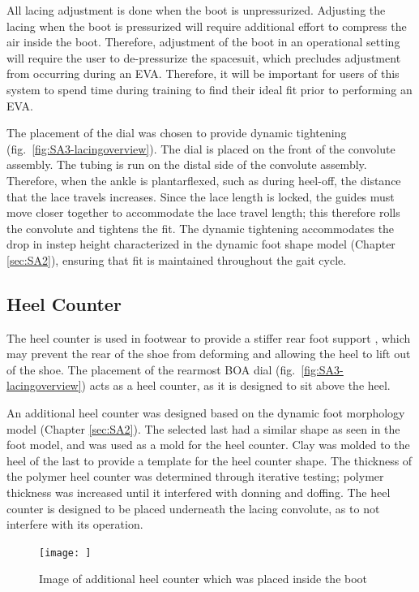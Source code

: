 \documentclass[defaultstyle,11pt]{thesis}
\begin{document}
All lacing adjustment is done when the boot is unpressurized.
Adjusting the lacing when the boot is pressurized will require additional effort to compress the air inside the boot.
Therefore, adjustment of the boot in an operational setting will require the user to de-pressurize the spacesuit, which precludes adjustment from occurring during an EVA.
Therefore, it will be important for users of this system to spend time during training to find their ideal fit prior to performing an EVA.

The placement of the dial was chosen to provide dynamic tightening (fig.~\ref{fig:SA3-lacingoverview}).
The dial is placed on the front of the convolute assembly.
The tubing is run on the distal side of the convolute assembly.
Therefore, when the ankle is plantarflexed, such as during heel-off, the distance that the lace travels increases.
Since the lace length is locked, the guides must move closer together to accommodate the lace travel length; this therefore rolls the convolute and tightens the fit.
The dynamic tightening accommodates the drop in instep height characterized in the dynamic foot shape model (Chapter \ref{sec:SA2}), ensuring that fit is maintained throughout the gait cycle.

\hypertarget{heel-counter}{%
\subsection{Heel Counter}\label{heel-counter}}

The heel counter is used in footwear to provide a stiffer rear foot support \citep{Van1995}, which may prevent the rear of the shoe from deforming and allowing the heel to lift out of the shoe.
The placement of the rearmost BOA dial (fig.~\ref{fig:SA3-lacingoverview}) acts as a heel counter, as it is designed to sit above the heel.

An additional heel counter was designed based on the dynamic foot morphology model (Chapter \ref{sec:SA2}).
The selected last had a similar shape as seen in the foot model, and was used as a mold for the heel counter.
Clay was molded to the heel of the last to provide a template for the heel counter shape.
The thickness of the polymer heel counter was determined through iterative testing; polymer thickness was increased until it interfered with donning and doffing.
The heel counter is designed to be placed underneath the lacing convolute, as to not interfere with its operation.

\begin{figure}
\hypertarget{fig:SA3-heelcounter}{%
\centering
\texttt{[image: ]}
\caption{Image of additional heel counter which was placed inside the boot}\label{fig:SA3-heelcounter}
}
\end{figure}
\end{document}
